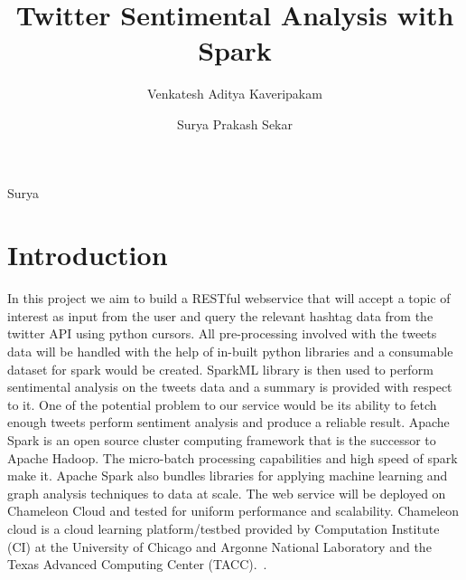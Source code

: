
\title{Twitter Sentimental Analysis with Spark}


\author{Venkatesh Aditya Kaveripakam}

\author{Surya Prakash Sekar}

\renewcommand{\shortauthors}{Aditya}{Surya}


\begin{abstract}

\end{abstract}



\maketitle

\section{Introduction}
In this project we aim to build a RESTful webservice that will accept a topic
of interest as input from the user and query the relevant hashtag data from
the twitter API using python cursors. All pre-processing involved with the
tweets data will be handled with the help of in-built python libraries and a
consumable dataset for spark would be created. SparkML library is then used
to perform sentimental analysis on the tweets data and a summary is provided
with respect to it. One of the potential problem to our service would be its
ability to fetch enough tweets perform sentiment analysis and produce a
reliable result.
Apache Spark is an open source cluster computing framework that is the
successor to Apache Hadoop. The micro-batch processing capabilities and high
speed of spark make it. Apache Spark also bundles libraries for applying
machine learning and graph analysis techniques to data at scale.
The web service will be deployed on Chameleon Cloud and tested for uniform
performance and scalability. Chameleon cloud is a cloud learning
platform/testbed provided by Computation Institute (CI) at the University of
Chicago and Argonne National Laboratory and the Texas Advanced Computing
Center (TACC).~\cite{hid-sp18-418-chameleon-about}.



 
